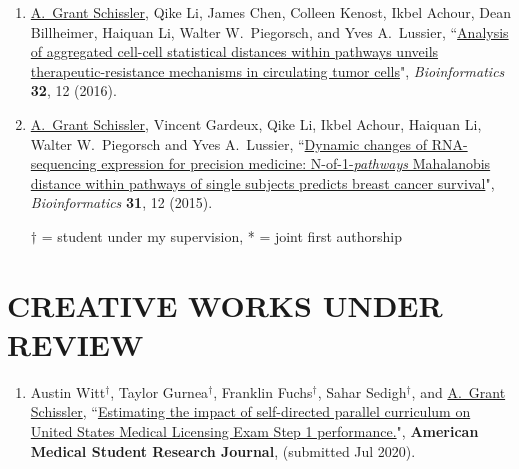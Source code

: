 \documentclass[paper=a4,fontsize=11pt]{scrartcl} %
\newcommand{\NewPart}[2]{\section*{\uppercase{#1} #2 }}
\newcommand{\PaperEntry}[7]{
		\noindent #1, ``\href{#7}{#2}", \textit{#3} \textbf{#4}, #5 (#6).}
\begin{document}
\begin{enumerate}
\item \PaperEntry{\underline{A.~Grant Schissler}, Qike Li, James Chen, Colleen Kenost, Ikbel Achour, Dean Billheimer, Haiquan Li, Walter W.~Piegorsch, and Yves A.~Lussier}{Analysis of aggregated cell-cell statistical distances within pathways unveils therapeutic-resistance mechanisms in circulating tumor cells}{Bioinformatics}{32}{12}{2016}{http://bioinformatics.oxfordjournals.org/content/32/12/i80.full}

\item \PaperEntry{\underline{A.~Grant Schissler}, Vincent Gardeux, Qike Li, Ikbel Achour, Haiquan Li, Walter W.~Piegorsch and Yves A.~Lussier}{Dynamic changes of RNA-sequencing expression for precision medicine: N-of-1-\textit{pathways} Mahalanobis distance within pathways of single subjects predicts breast cancer survival}{Bioinformatics}{31}{12}{2015}{http://bioinformatics.oxfordjournals.org/content/31/12/i293.full}

  $\dagger$ = student under my supervision, * = joint first authorship
\end{enumerate}


\NewPart{Creative works under review}{}
\vspace{-7pt}
\begin{enumerate}

  \item \PaperEntry{Austin Witt$^{\dagger}$, Taylor Gurnea$^{\dagger}$, Franklin Fuchs$^{\dagger}$, Sahar Sedigh$^{\dagger}$, and \underline{A.~Grant Schissler}}{Estimating the impact of self-directed parallel curriculum on United States Medical Licensing Exam Step 1 performance.}{}{American Medical Student Research Journal}{}{submitted Jul 2020}{}

\end{enumerate}
\end{document}
